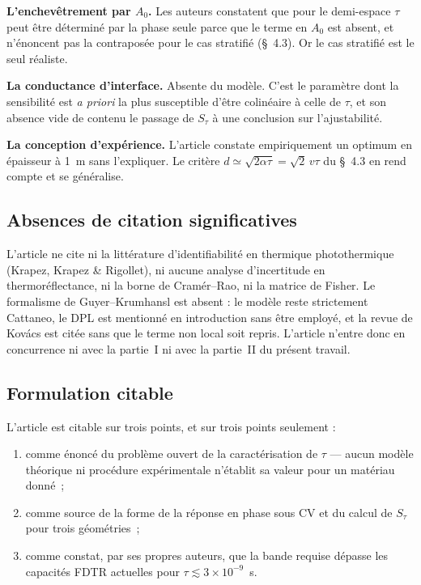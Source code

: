 \documentclass[11pt,a4paper]{article}
\begin{document}
\textbf{L'enchevêtrement par $A_0$.} Les auteurs constatent que pour le demi-espace $\tau$ peut
être déterminé par la phase seule parce que le terme en $A_0$ est absent, et n'énoncent pas la
contraposée pour le cas stratifié (§~4.3). Or le cas stratifié est le seul réaliste.

\textbf{La conductance d'interface.} Absente du modèle. C'est le paramètre dont la sensibilité
est \textit{a priori} la plus susceptible d'être colinéaire à celle de $\tau$, et son absence
vide de contenu le passage de $S_\tau$ à une conclusion sur l'ajustabilité.

\textbf{La conception d'expérience.} L'article constate empiriquement un optimum en épaisseur à
1~\textmu m sans l'expliquer. Le critère $d \simeq \sqrt{2\alpha\tau} = \sqrt2\,v\tau$ du §~4.3
en rend compte et se généralise.

\subsection{Absences de citation significatives}

L'article ne cite ni la littérature d'identifiabilité en thermique photothermique (Krapez,
Krapez \& Rigollet), ni aucune analyse d'incertitude en thermoréflectance, ni la borne de
Cramér--Rao, ni la matrice de Fisher. Le formalisme de Guyer--Krumhansl est absent : le modèle
reste strictement Cattaneo, le DPL est mentionné en introduction sans être employé, et la revue
de Kovács est citée sans que le terme non local soit repris. L'article n'entre donc en
concurrence ni avec la partie~I ni avec la partie~II du présent travail.

\subsection{Formulation citable}

L'article est citable sur trois points, et sur trois points seulement :

\begin{enumerate}[leftmargin=1.6em,itemsep=2pt,topsep=2pt]
\item comme énoncé du problème ouvert de la caractérisation de $\tau$ --- aucun modèle théorique
      ni procédure expérimentale n'établit sa valeur pour un matériau donné~;
\item comme source de la forme de la réponse en phase sous CV et du calcul de $S_\tau$ pour
      trois géométries~;
\item comme constat, par ses propres auteurs, que la bande requise dépasse les capacités FDTR
      actuelles pour $\tau \lesssim 3\times10^{-9}$~s.
\end{enumerate}
\end{document}

